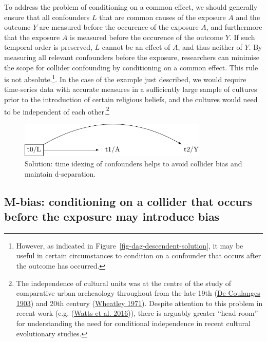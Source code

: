 \documentclass[
  singlecolumn]{report}
\begin{document}
To address the problem of conditioning on a common effect, we should
generally ensure that all confounders \(L\) that are common causes of
the exposure \(A\) and the outcome \(Y\) are measured before the
occurence of the exposure \(A\), and furthermore that the exposure \(A\)
is measured before the occurence of the outcome \(Y\). If such temporal
order is preserved, \(L\) cannot be an effect of \(A\), and thus neither
of \(Y\). By measuring all relevant confounders before the exposure,
researchers can minimise the scope for collider confounding by
conditioning on a common effect. This rule is not absolute.\footnote{However,
  as indicated in Figure~\ref{fig-dag-descendent-solution}, it may be
  useful in certain circumstances to condition on a confounder that
  occurs after the outcome has occurred.}. In the case of the example
just described, we would require time-series data with accurate measures
in a sufficiently large sample of cultures prior to the introduction of
certain religious beliefs, and the cultures would need to be independent
of each other.\footnote{The independence of cultural units was at the
  centre of the study of comparative urban archeaology throughout from
  the late 19th (\protect\hyperlink{ref-decoulanges1903}{De Coulanges
  1903}) and 20th century (\protect\hyperlink{ref-wheatley1971}{Wheatley
  1971}). Despite attention to this problem in recent work (e.g.
  (\protect\hyperlink{ref-watts2016}{Watts et al. 2016})), there is
  arguably greater ``head-room'' for understanding the need for
  conditional independence in recent cultural evolutionary studies.}

\begin{figure}

{\centering \includegraphics[width=0.8\textwidth,height=\textheight]{causal-dags_files/figure-pdf/fig-dag-common-effect-solution-1.pdf}

}

\caption{\label{fig-dag-common-effect-solution}Solution: time idexing of
confounders helps to avoid collider bias and maintain d-separation.}

\end{figure}

\hypertarget{m-bias-conditioning-on-a-collider-that-occurs-before-the-exposure-may-introduce-bias}{%
\subsection{M-bias: conditioning on a collider that occurs before the
exposure may introduce
bias}\label{m-bias-conditioning-on-a-collider-that-occurs-before-the-exposure-may-introduce-bias}}
\end{document}
